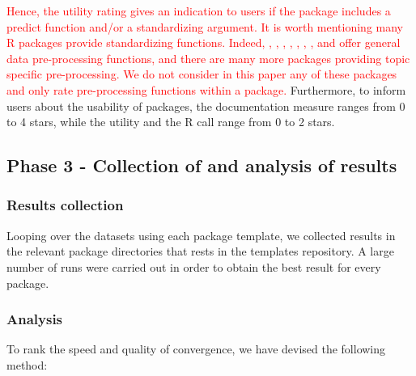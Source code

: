 \textcolor{red}{
Hence, the utility rating gives an indication to users if the package
includes a predict function and/or a standardizing argument. 
It is worth mentioning many \textsf{R} packages provide standardizing
functions. Indeed, , , ,
, , , 
, and  offer general data pre-processing
functions, and there are many more packages providing topic specific pre-processing.
We do not consider in this paper any of these packages and only rate
pre-processing functions within a package.} Furthermore, to inform users
about the usability of packages, the documentation measure ranges from 0
to 4 stars, while the utility and the \textsf{R} call range from 0 to 2
stars.

\hypertarget{phase-3---collection-of-and-analysis-of-results}{%
\subsection{Phase 3 - Collection of and analysis of
results}\label{phase-3---collection-of-and-analysis-of-results}}

\hypertarget{results-collection}{%
\subsubsection{Results collection}\label{results-collection}}

Looping over the datasets using each package template, we collected
results in the relevant package directories that rests in the templates
repository. A large number of runs were carried out in order to obtain
the best result for every package.

\hypertarget{analysis}{%
\subsubsection{Analysis}\label{analysis}}

To rank the speed and quality of convergence, we have devised the
following method:

